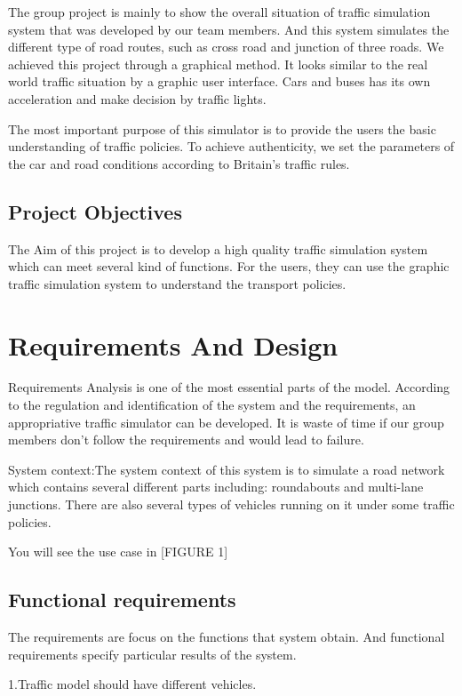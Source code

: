 \documentclass[12pt]{amsart}
\begin{document}
The group project is mainly to show the overall situation of traffic simulation system that was developed by our team members. And this system simulates the different type of road routes, such as cross road and junction of three roads. We achieved this project through a graphical method. It looks similar to the real world traffic situation by a graphic user interface. Cars and buses has its own acceleration and make decision by traffic lights.


The most important purpose of this simulator is to provide the users the basic understanding of traffic policies. To achieve authenticity, we set the parameters of the car and road conditions according to Britain's traffic rules.

\subsection{Project Objectives}

The Aim of this project is to develop a high quality traffic simulation system which can meet several kind of functions. For the users, they can use the graphic traffic simulation system to understand the transport policies.

\section{Requirements And Design}

Requirements Analysis is one of the most essential parts of the model. According to the regulation and identification of the system and the requirements, an appropriative traffic simulator can be developed. It is waste of time if our group members don't follow the requirements and would lead to failure.

System context:The system context of this system is to simulate a road network which contains several different parts including: roundabouts and multi-lane junctions. There are also several types of vehicles running on it under some traffic policies. 

You will see the use case in [FIGURE 1] 

\subsection{Functional requirements}
The requirements are focus on the functions that system obtain. And functional requirements specify particular results of the system.

1.Traffic model should have different vehicles.
\end{document}
